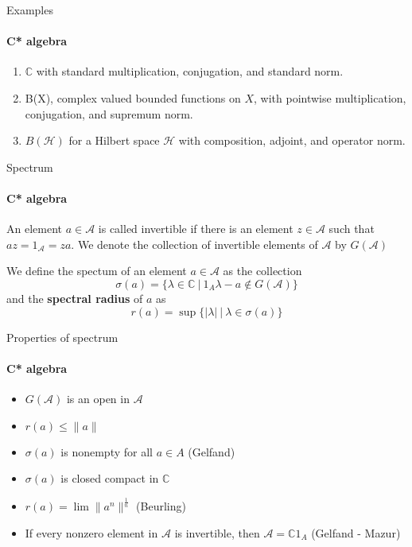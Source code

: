 \documentclass[handout, dvipsnames]{beamer}
\newcommand{\1}{\mathds{1}}	%
\begin{document}
\begin{frame}{Examples}
\framesubtitle{C* algebra}
\begin{enumerate}
  \item $\mathbb{C}$ with standard multiplication, conjugation, and standard norm. \pause
  \item B(X), complex valued bounded functions on $X$, with pointwise multiplication, conjugation, and supremum norm.
  \item $B(\mathcal{H})$ for a Hilbert space $\mathcal{H}$ with composition, adjoint, and operator norm.
\end{enumerate}
\end{frame}

\begin{frame}{Spectrum}
\framesubtitle{C* algebra}
\begin{definition}
    An element $a \in \mathcal{A}$ is called invertible if there is an element $z \in \mathcal{A}$ such that $az = 1_\mathcal{A} = za$. \pause
    We denote the collection of invertible elements of $\mathcal{A}$ by $G(\mathcal{A})$
\end{definition} \pause

\begin{definition}
  We define the spectum of an element $a \in \mathcal{A}$ as the collection $$\sigma(a) = \{ \lambda \in \mathbb{C} \ |  \ 1_A \lambda - a \notin G(\mathcal{A})\}$$ \pause
  and the {\bf spectral radius} of $a$ as $$r(a) = \sup \{ |\lambda| \ | \ \lambda \in \sigma(a) \}$$
\end{definition}
\end{frame}

\begin{frame}{Properties of spectrum}
\framesubtitle{C* algebra}
\begin{itemize}
  \item $G(\mathcal{A})$ is an open in $\mathcal{A}$ \pause
  \item $r(a) \le \|a\|$ \pause
  \item $\sigma(a)$ is nonempty for all $a \in A$ (Gelfand) \pause
  \item $\sigma(a)$ is closed compact in $\mathbb{C}$ \pause
  \item $r(a) = \lim \|a^n\|^\frac{1}{n}$ (Beurling) \pause
  \item If every nonzero element in $\mathcal{A}$ is invertible, then $\mathcal{A} = \mathbb{C}1_A$ (Gelfand - Mazur)
\end{itemize}
\end{frame}
\end{document}
